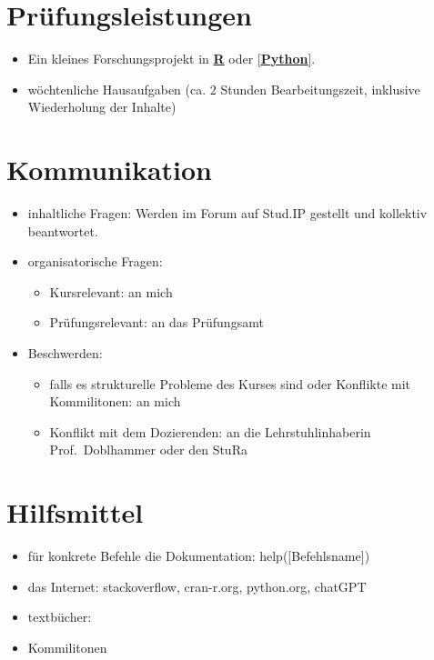 \section{Prüfungsleistungen}\label{pruxfcfungsleistungen}

\begin{itemize}
\tightlist
\item
  Ein kleines Forschungsprojekt in
  \href{https://www.r-project.org/}{\textbf{R}} oder
  \href{https://www.python.org/}{{[}\textbf{Python}{]}}.
\item
  wöchtenliche Hausaufgaben (ca. 2 Stunden Bearbeitungszeit, inklusive
  Wiederholung der Inhalte)
\end{itemize}

\section{Kommunikation}\label{kommunikation}

\begin{itemize}
\tightlist
\item
  inhaltliche Fragen: Werden im Forum auf Stud.IP gestellt und kollektiv
  beantwortet.
\item
  organisatorische Fragen:

  \begin{itemize}
  \tightlist
  \item
    Kursrelevant: an mich
  \item
    Prüfungsrelevant: an das Prüfungsamt
  \end{itemize}
\item
  Beschwerden:

  \begin{itemize}
  \tightlist
  \item
    falls es strukturelle Probleme des Kurses sind oder Konflikte mit
    Kommilitonen: an mich
  \item
    Konflikt mit dem Dozierenden: an die Lehrstuhlinhaberin
    Prof.~Doblhammer oder den StuRa
  \end{itemize}
\end{itemize}

\section{Hilfsmittel}\label{hilfsmittel}

\begin{itemize}
\tightlist
\item
  für konkrete Befehle die Dokumentation: help({[}Befehlsname{]})
\item
  das Internet: stackoverflow, cran-r.org, python.org, chatGPT
\item
  textbücher:
\item
  Kommilitonen
\end{itemize}

